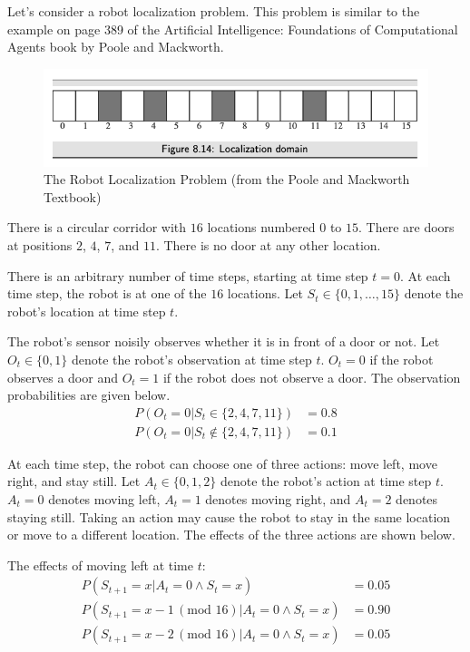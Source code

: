 \documentclass[12pt]{article}
\begin{document}
Let's consider a robot localization problem. This problem is similar to the example on page 389 of the Artificial Intelligence: Foundations of Computational Agents book by Poole and Mackworth.

\begin{figure}[ht!]
    \centering
    \includegraphics[scale=0.6]{images_posted/robot_localization.png}
    \caption{The Robot Localization Problem (from the Poole and Mackworth Textbook)}
    \label{fig:robot_localization_corridor}
\end{figure}

There is a circular corridor with $16$ locations numbered $0$ to $15$. There are doors at positions $2$, $4$, $7$, and $11$. There is no door at any other location. 

There is an arbitrary number of time steps, starting at time step $t = 0$. At each time step, the robot is at one of the $16$ locations. Let $S_t \in \{0, 1, \dots, 15\}$ denote the robot's location at time step $t$.

The robot's sensor noisily observes whether it is in front of a door or not. Let $O_t \in \{0, 1\}$ denote the robot's observation at time step $t$. $O_t = 0$ if the robot observes a door and $O_t = 1$ if the robot does not observe a door. The observation probabilities are given below.
%
\begin{align}
P(O_t = 0 | S_t \in \{2, 4, 7, 11\} ) & = 0.8 \\
P(O_t = 0 | S_t \not\in \{2, 4, 7, 11\} ) & = 0.1 
\end{align}

At each time step, the robot can choose one of three actions: move left, move right, and stay still. Let $A_t \in \{0, 1, 2\}$ denote the robot's action at time step $t$. $A_t = 0$ denotes moving left, $A_t = 1$ denotes moving right, and $A_t = 2$ denotes staying still. Taking an action may cause the robot to stay in the same location or move to a different location. The effects of the three actions are shown below.

The effects of moving left at time $t$:
%
\begin{align}
P(S_{t+1} = x | A_t = 0\land S_t = x) & = 0.05\\    
P(S_{t+1} = x - 1 \,(\text{mod } 16) | A_t = 0 \land S_t = x) & = 0.90\\    
P(S_{t+1} = x - 2 \,(\text{mod } 16)| A_t = 0 \land S_t = x) & = 0.05
\end{align}
\end{document}
